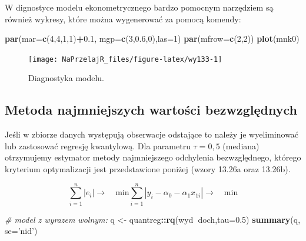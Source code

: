 \documentclass[polish,]{book}
\newenvironment{Shaded}{\begin{snugshade}}{\end{snugshade}}
\newcommand{\CommentTok}[1]{\textcolor[rgb]{0.56,0.35,0.01}{\textit{#1}}}
\newcommand{\DataTypeTok}[1]{\textcolor[rgb]{0.13,0.29,0.53}{#1}}
\newcommand{\DecValTok}[1]{\textcolor[rgb]{0.00,0.00,0.81}{#1}}
\newcommand{\FloatTok}[1]{\textcolor[rgb]{0.00,0.00,0.81}{#1}}
\newcommand{\KeywordTok}[1]{\textcolor[rgb]{0.13,0.29,0.53}{\textbf{#1}}}
\newcommand{\NormalTok}[1]{#1}
\newcommand{\OperatorTok}[1]{\textcolor[rgb]{0.81,0.36,0.00}{\textbf{#1}}}
\newcommand{\StringTok}[1]{\textcolor[rgb]{0.31,0.60,0.02}{#1}}
\begin{document}
W dignostyce modelu ekonometrycznego bardzo pomocnym narzędziem są również
wykresy, które można wygenerować za pomocą komendy:

\begin{Shaded}
\begin{Highlighting}[]
\KeywordTok{par}\NormalTok{(}\DataTypeTok{mar=}\KeywordTok{c}\NormalTok{(}\DecValTok{4}\NormalTok{,}\DecValTok{4}\NormalTok{,}\DecValTok{1}\NormalTok{,}\DecValTok{1}\NormalTok{)}\OperatorTok{+}\FloatTok{0.1}\NormalTok{, }\DataTypeTok{mgp=}\KeywordTok{c}\NormalTok{(}\DecValTok{3}\NormalTok{,}\FloatTok{0.6}\NormalTok{,}\DecValTok{0}\NormalTok{),}\DataTypeTok{las=}\DecValTok{1}\NormalTok{)}
\KeywordTok{par}\NormalTok{(}\DataTypeTok{mfrow=}\KeywordTok{c}\NormalTok{(}\DecValTok{2}\NormalTok{,}\DecValTok{2}\NormalTok{))}
\KeywordTok{plot}\NormalTok{(mnk0)}
\end{Highlighting}
\end{Shaded}

\begin{figure}[h]

{\centering \texttt{[image: NaPrzelajR\_files/figure-latex/wy133-1]} 

}

\caption{Diagnostyka modelu.}\label{fig:wy133}
\end{figure}

\hypertarget{part_13.2.6}{%
\subsection{Metoda najmniejszych wartości bezwzględnych}\label{part_13.2.6}}

Jeśli w zbiorze danych występują obserwacje odstające to należy je wyeliminować
lub zastosować regresję kwantylową. Dla parametru \(\tau = 0,5\) (mediana) otrzymujemy estymator metody najmniejszego odchylenia bezwzględnego, którego kryterium optymalizacji jest przedstawione poniżej (wzory 13.26a oraz 13.26b).

\begin{subequations}
\begin{equation}
\sum_{i=1}^{n}|e_i| \longrightarrow\quad\mbox{min}
\label{eq:wz1326a}
\end{equation}
\begin{equation}
\sum_{i=1}^{n}|y_i-\alpha_0-\alpha_1x_{1i}| \longrightarrow\quad\mbox{min}
\label{eq:wz1326b}
\end{equation}
\end{subequations}

\begin{Shaded}
\begin{Highlighting}[]
\CommentTok{# model z wyrazem wolnym:}
\NormalTok{q <-}\StringTok{ }\NormalTok{quantreg}\OperatorTok{::}\KeywordTok{rq}\NormalTok{(wyd}\OperatorTok{~}\NormalTok{doch,}\DataTypeTok{tau=}\FloatTok{0.5}\NormalTok{)}
\KeywordTok{summary}\NormalTok{(q, }\DataTypeTok{se=}\StringTok{'nid'}\NormalTok{)}
\end{Highlighting}
\end{Shaded}
\end{document}
